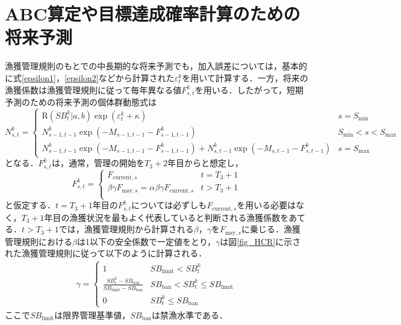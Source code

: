 \documentclass[11pt]{jsarticle}
\begin{document}
\section{ABC算定や目標達成確率計算のための将来予測}
漁獲管理規則のもとでの中長期的な将来予測でも，加入誤差については，基本的に式\ref{epsilon1}，\ref{epsilon2}などから計算された$\varepsilon_t^k$を用いて計算する．一方，将来の漁獲係数は漁獲管理規則に従って毎年異なる値$F_{s,t}^k$を用いる．したがって，短期予測のための将来予測の個体群動態式は
\begin{equation}
  N_{s,t}^k = \begin{cases}
    \mathrm{R}(S\!B_{t}^k|a,b) \exp (\varepsilon_t^k + \kappa) &     s = S_\mathrm{min} \\    
    N_{s-1, t-1}^k  \exp(-M_{s-1,t-1}- F_{s-1,t-1}^k )  &    S_\mathrm{min} < s < S_\mathrm{max} \\
    N_{s-1, t-1}^k  \exp(-M_{s-1,t-1}- F_{s-1,t-1}^k ) + N_{s,t-1}^k  \exp(-M_{s,t-1} - F_{s,t-1}^k) &   s=S_{\mathrm{max}}
  \end{cases}
  \label{future_eq3}
\end{equation}
となる．$F_{s,t}^k$は，通常，管理の開始を$T_{3}+2$年目からと想定し，
\begin{equation}
  F_{s,t}^k = \begin{cases}
   F_{\mathrm{current},s} &     t = T_3+1 \\    
   \beta \gamma  F_{\mathrm{msy},s} = \alpha \beta \gamma F_{\mathrm{current},s}
   &     t > T_3+1 \\
  \end{cases}
  \label{future_eq4}
\end{equation}
と仮定する．$t=T_3+1$年目の$F_{s,t}^k$については必ずしも$F_{\mathrm{current},s}$を用いる必要はなく，$T_3+1$年目の漁獲状況を最もよく代表していると判断される漁獲係数をあてる．$t>T_3+1$では，漁獲管理規則から計算される$\beta$，$\gamma$を$F_{\mathrm{msy},s}$に乗じる．漁獲管理規則における$\beta$は1以下の安全係数で一定値をとり，$\gamma$は図\ref{fig_HCR}に示された漁獲管理規則に従って以下のように計算される．
\begin{eqnarray}
  \gamma =
  \begin{cases}
    1   &  S\!B_{\mathrm{limit}} < S\!B_t^k \\
    \frac{S\!B_t^k-S\!B_{\mathrm{ban}}}{S\!B_{\mathrm{limit}} -S\!B_{\mathrm{ban}}}  & S\!B_{\mathrm{ban}} < S\!B_t^k \leq S\!B_{\mathrm{limit}} \\
    0    &   S\!B_t^k \leq S\!B_{\mathrm{ban}}
  \end{cases}
\end{eqnarray}
ここで$S\!B_{\mathrm{limit}}$は限界管理基準値，$S\!B_{\mathrm{ban}}$は禁漁水準である．
\end{document}
